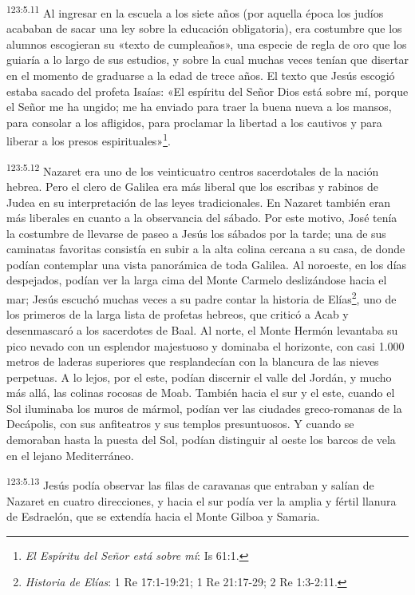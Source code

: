 \par
\textsuperscript{123:5.11} Al ingresar en la escuela a los siete años (por aquella época los judíos acababan de sacar una ley sobre la educación obligatoria), era costumbre que los alumnos escogieran su «texto de cumpleaños», una especie de regla de oro que los guiaría a lo largo de sus estudios, y sobre la cual muchas veces tenían que disertar en el momento de graduarse a la edad de trece años. El texto que Jesús escogió estaba sacado del profeta Isaías: «El espíritu del Señor Dios está sobre mí, porque el Señor me ha ungido; me ha enviado para traer la buena nueva a los mansos, para consolar a los afligidos, para proclamar la libertad a los cautivos y para liberar a los presos espirituales»\footnote{\textit{El Espíritu del Señor está sobre mí}: Is 61:1.}.

\par
\textsuperscript{123:5.12} Nazaret era uno de los veinticuatro centros sacerdotales de la nación hebrea. Pero el clero de Galilea era más liberal que los escribas y rabinos de Judea en su interpretación de las leyes tradicionales. En Nazaret también eran más liberales en cuanto a la observancia del sábado. Por este motivo, José tenía la costumbre de llevarse de paseo a Jesús los sábados por la tarde; una de sus caminatas favoritas consistía en subir a la alta colina cercana a su casa, de donde podían contemplar una vista panorámica de toda Galilea. Al noroeste, en los días despejados, podían ver la larga cima del Monte Carmelo deslizándose hacia el mar; Jesús escuchó muchas veces a su padre contar la historia de Elías\footnote{\textit{Historia de Elías}: 1 Re 17:1-19:21; 1 Re 21:17-29; 2 Re 1:3-2:11.}, uno de los primeros de la larga lista de profetas hebreos, que criticó a Acab y desenmascaró a los sacerdotes de Baal. Al norte, el Monte Hermón levantaba su pico nevado con un esplendor majestuoso y dominaba el horizonte, con casi 1.000 metros de laderas superiores que resplandecían con la blancura de las nieves perpetuas. A lo lejos, por el este, podían discernir el valle del Jordán, y mucho más allá, las colinas rocosas de Moab. También hacia el sur y el este, cuando el Sol iluminaba los muros de mármol, podían ver las ciudades greco-romanas de la Decápolis, con sus anfiteatros y sus templos presuntuosos. Y cuando se demoraban hasta la puesta del Sol, podían distinguir al oeste los barcos de vela en el lejano Mediterráneo.

\par
\textsuperscript{123:5.13} Jesús podía observar las filas de caravanas que entraban y salían de Nazaret en cuatro direcciones, y hacia el sur podía ver la amplia y fértil llanura de Esdraelón, que se extendía hacia el Monte Gilboa y Samaria.

